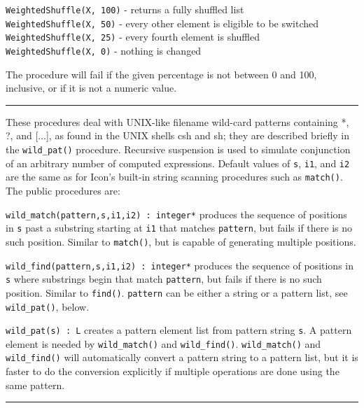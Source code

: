 \texttt{WeightedShuffle(X, 100)} - returns a fully shuffled list\\
\texttt{WeightedShuffle(X, 50)} - every other element is eligible to be
switched\\
\texttt{WeightedShuffle(X, 25)} - every fourth element is
shuffled\\
\texttt{WeightedShuffle(X, 0)} - nothing is changed

The procedure will fail if the given percentage is not between 0 and
100, inclusive, or if it is not a numeric value.

\vspace{0.25cm}\hrule{}

These procedures deal with UNIX-like filename
wild-card patterns containing *, ?, and
[...], as found in
the UNIX shells csh and sh; they are described briefly in the
\texttt{wild\_pat()} procedure. 
Recursive suspension is used to simulate conjunction of an arbitrary number of
computed expressions.
Default values of \texttt{s}, \texttt{i1}, and \texttt{i2} are the same
as for Icon's built-in string scanning procedures such
as \texttt{match()}.
The public procedures are:

\texttt{wild\_match(pattern,s,i1,i2) : integer*} produces the sequence
of positions in \texttt{s} past a substring starting at \texttt{i1}
that matches \texttt{pattern}, but fails if there is no such position.
Similar to \texttt{match()}, but is capable of generating multiple
positions.

\texttt{wild\_find(pattern,s,i1,i2) : integer*} produces the sequence of
positions in \texttt{s} where substrings begin that match
\texttt{pattern}, but fails if there is no such position. Similar to
\texttt{find()}. \texttt{pattern} can be either a string or a pattern
list, see \texttt{wild\_pat()}, below.

\texttt{wild\_pat(s) : L} creates a pattern element list from pattern
string \texttt{s}. A pattern element is needed by
\texttt{wild\_match()} and \texttt{wild\_find()}.
\texttt{wild\_match()} and \texttt{wild\_find()} will automatically
convert a pattern string to a pattern list, but it is faster to do the
conversion explicitly if multiple operations are done using the same
pattern.

\vspace{0.25cm}\hrule{}

